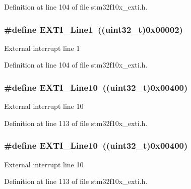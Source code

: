 Definition at line 104 of file stm32f10x\+\_\+exti.\+h.

\subsubsection[{\texorpdfstring{E\+X\+T\+I\+\_\+\+Line1}{EXTI_Line1}}]{\setlength{\rightskip}{0pt plus 5cm}\#define E\+X\+T\+I\+\_\+\+Line1~(({\bf uint32\+\_\+t})0x00002)}\hypertarget{group___e_x_t_i___lines_gae7c6ab2a0880ce3810641ee0585104cd}{}\label{group___e_x_t_i___lines_gae7c6ab2a0880ce3810641ee0585104cd}
External interrupt line 1 

Definition at line 104 of file stm32f10x\+\_\+exti.\+h.

\subsubsection[{\texorpdfstring{E\+X\+T\+I\+\_\+\+Line10}{EXTI_Line10}}]{\setlength{\rightskip}{0pt plus 5cm}\#define E\+X\+T\+I\+\_\+\+Line10~(({\bf uint32\+\_\+t})0x00400)}\hypertarget{group___e_x_t_i___lines_gaefb90b266f5fc1571ed4606bbff1f1d7}{}\label{group___e_x_t_i___lines_gaefb90b266f5fc1571ed4606bbff1f1d7}
External interrupt line 10 

Definition at line 113 of file stm32f10x\+\_\+exti.\+h.

\subsubsection[{\texorpdfstring{E\+X\+T\+I\+\_\+\+Line10}{EXTI_Line10}}]{\setlength{\rightskip}{0pt plus 5cm}\#define E\+X\+T\+I\+\_\+\+Line10~(({\bf uint32\+\_\+t})0x00400)}\hypertarget{group___e_x_t_i___lines_gaefb90b266f5fc1571ed4606bbff1f1d7}{}\label{group___e_x_t_i___lines_gaefb90b266f5fc1571ed4606bbff1f1d7}
External interrupt line 10 

Definition at line 113 of file stm32f10x\+\_\+exti.\+h.

